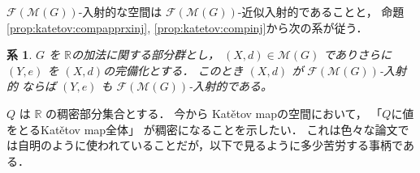\documentclass[leqno, 12pt]{jsarticle}
\newtheorem{cor}[thm]{系}
\newcommand{\rr}{\mathbb{R}}
\begin{document}
$\mathscr{F}(\mathscr{M}(G))$-入射的な空間は
$\mathscr{F}(\mathscr{M}(G))$-近似入射的であることと，
命題 \ref{prop:katetov:compapprxinj},  \ref{prop:katetov:compinj}から次の系が従う．
%
\begin{cor}\label{cor:katetov:completion}
$G$
を
$\rr$の加法に関する部分群とし，
$(X, d)\in \mathscr{M}(G)$
でありさらに
$(Y, e)$
を
$(X, d)$の完備化とする．
このとき
$(X, d)$
が
$\mathscr{F}(\mathscr{M}(G))$-入射的
ならば
$(Y, e)$
も
$\mathscr{F}(\mathscr{M}(G))$-入射的である。
\end{cor}


$Q$
は
$\rr$
の稠密部分集合とする．
今から
Kat\v{e}tov mapの空間において，
「$Q$に値をとるKat\v{e}tov map全体」
が稠密になることを示したい．
これは色々な論文では自明のように使われていることだが，以下で見るように多少苦労する事柄である．
\end{document}
